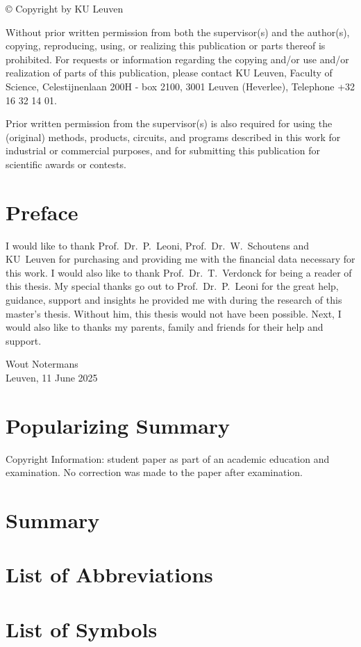 \thispagestyle{empty}
\null
\newpage

\thispagestyle{empty}
\null
\vfill

© Copyright by KU Leuven

Without prior written permission from both the supervisor(s) and the author(s), copying, reproducing, using, or realizing this publication or parts thereof is prohibited. For requests or information regarding the copying and/or use and/or realization of parts of this publication, please contact KU Leuven, Faculty of Science, Celestijnenlaan 200H - box 2100, 3001 Leuven (Heverlee), Telephone +32 16 32 14 01.

Prior written permission from the supervisor(s) is also required for using the (original) methods, products, circuits, and programs described in this work for industrial or commercial purposes, and for submitting this publication for scientific awards or contests.

\newpage

\thispagestyle{empty}
\null
\newpage

\chapter{Preface}
I would like to thank Prof.~Dr.~P.~Leoni, Prof.~Dr.~W.~Schoutens and KU~Leuven for purchasing and providing me with the financial data necessary for this work. I would also like to thank Prof.~Dr.~T.~Verdonck for being a reader of this thesis. My special thanks go out to Prof.~Dr.~P.~Leoni for the great help, guidance, support and insights he provided me with during the research of this master's thesis. Without him, this thesis would not have been possible. Next, I would also like to thanks my parents, family and friends for their help and support.

\begin{flushright}
  Wout Notermans\\
  Leuven, 11 June 2025
\end{flushright}
\newpage

\chapter{Popularizing Summary}
\vfill
Copyright Information: student paper as part of an academic education and examination. No correction was made to the paper after examination.
\newpage

\chapter{Summary}
\newpage

\chapter{List of Abbreviations}
\newpage

\chapter{List of Symbols}
\newpage
